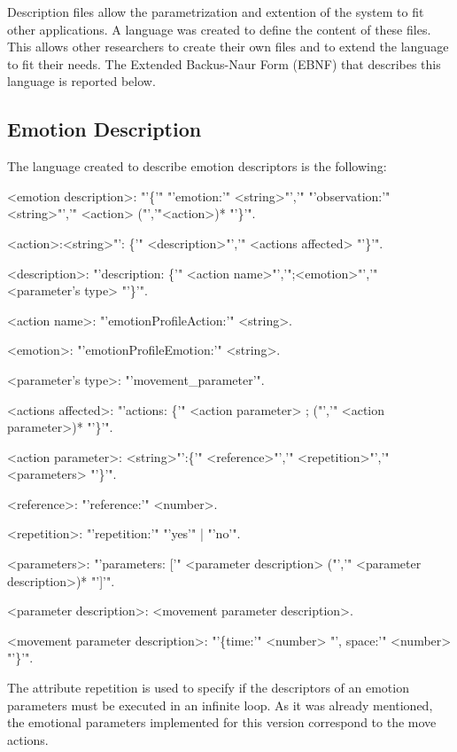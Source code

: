 Description files allow the parametrization and extention of the system to fit other applications. A language was created to define the content of these files. This allows other researchers to create their own files and to extend the language to fit their needs. The Extended Backus-Naur Form (EBNF) that describes this language is reported below.
\subsection{Emotion Description} 
The language created to describe emotion descriptors is the following:
\begin{small}

\begingrammar
%		
<emotion description>: "'\{'" "'emotion:'" <string>"','" "'observation:'" <string>"','" <action> ("','"<action>)* "'\}'".

<action>:<string>"': \{'" <description>"','" <actions affected> "'\}'".

<description>: "'description: \{'" <action name>"','";<emotion>"','" <parameter's type> "'\}'".

<action name>: "'emotionProfileAction:'" <string>.

<emotion>: "'emotionProfileEmotion:'" <string>.

<parameter's type>: "'movement\_parameter'".

<actions affected>: "'actions: \{'" <action parameter> ; ("','" <action parameter>)* "'\}'".

<action parameter>: <string>"':\{'" <reference>"','" <repetition>"','" <parameters> "'\}'".

<reference>: "'reference:'" <number>.

<repetition>: "'repetition:'" "'yes'" | "'no'".

<parameters>: "'parameters: ['" <parameter description> ("','" <parameter description>)* "']'".

<parameter description>: <movement parameter description>.

<movement parameter description>: "'\{time:'" <number> "', space:'" <number> "'\}'".

\endgrammar
\end{small}
The attribute repetition is used to specify if the descriptors of an emotion parameters must be executed in an infinite loop. As it was already mentioned, the emotional parameters implemented for this version correspond to the move actions.

